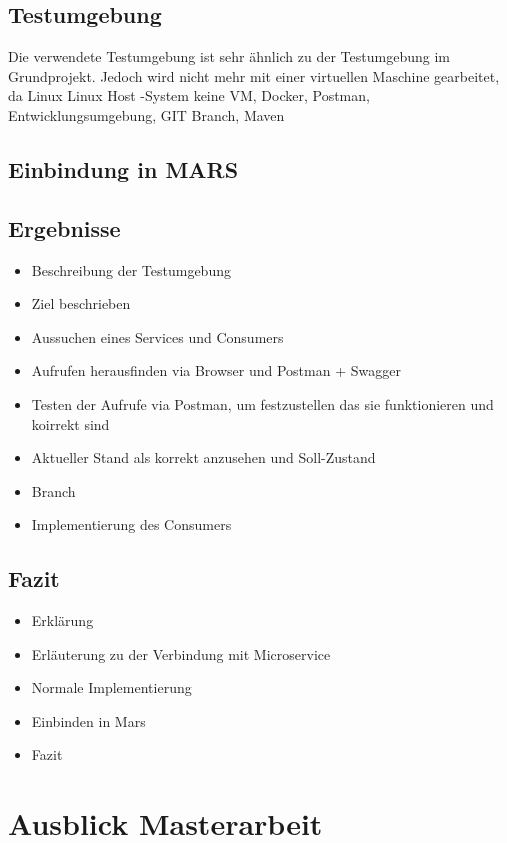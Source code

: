 \documentclass{llncs}
\begin{document}
\subsection{Testumgebung}
Die verwendete Testumgebung ist sehr ähnlich zu der Testumgebung im Grundprojekt. Jedoch wird nicht mehr mit einer virtuellen Maschine gearbeitet, da Linux
Linux Host -System keine VM, Docker, Postman, Entwicklungsumgebung, GIT Branch, Maven
\subsection{Einbindung in MARS}

\subsection{Ergebnisse}


\begin{itemize}
\item Beschreibung der Testumgebung
\item Ziel beschrieben
\item Aussuchen eines Services und Consumers
\item Aufrufen herausfinden via Browser und Postman + Swagger
\item Testen der Aufrufe via Postman, um festzustellen das sie funktionieren und koirrekt sind
\item Aktueller Stand als korrekt anzusehen und Soll-Zustand
\item Branch
\item Implementierung des Consumers
\end{itemize}

\subsection{Fazit}
\begin{itemize}
\item Erklärung
\item Erläuterung zu der Verbindung mit Microservice
\item Normale Implementierung
\item Einbinden in Mars
\item Fazit
\end{itemize}
\section{Ausblick Masterarbeit}





\end{document}
